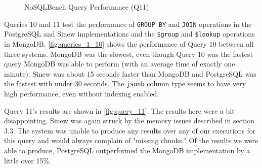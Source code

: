 \documentclass[sigconf]{acmart}
\begin{document}
\begin{figure}[!t]
\centering
{}
\caption{NoSQLBench Query Performance (Q11)}
\label{fig:query_11}
\end{figure}

Queries 10 and 11 test the performance of \texttt{GROUP BY} and \texttt{JOIN} operations in the PostgreSQL and Sinew implementations and the \texttt{\$group} and \texttt{\$lookup} operations in MongoDB. \autoref{fig:queries_1_10} shows the performance of Query 10 between all three systems. MongoDB was the slowest, even though Query 10 was the fastest query MongoDB was able to perform (with an average time of exactly one minute). Sinew was about 15 seconds faster than MongoDB and PostgreSQL was the fastest with under 30 seconds. The \texttt{jsonb} column type seems to have very high performance, even without indexing enabled.

Query 11's results are shown in \autoref{fig:query_11}. The results here were a bit disappointing. Sinew was again struck by the memory issues described in section 3.3. The system was unable to produce any results over any of our executions for this query and would always complain of "missing chunks." Of the results we were able to produce, PostgreSQL outperformed the MongoDB implementation by a little over 15\%. 



\end{document}

